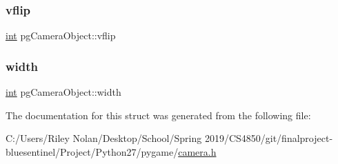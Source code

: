 \mbox{\label{structpg_camera_object_ae1a6d26813772f7fe9e13416ca05f1b8}} 
\subsubsection{\texorpdfstring{vflip}{vflip}}
{\footnotesize\ttfamily \mbox{\hyperlink{warnings_8h_a74f207b5aa4ba51c3a2ad59b219a423b}{int}} pg\+Camera\+Object\+::vflip}

\mbox{\label{structpg_camera_object_ad791238437a5d71c140bd39d6af87271}} 
\subsubsection{\texorpdfstring{width}{width}}
{\footnotesize\ttfamily \mbox{\hyperlink{warnings_8h_a74f207b5aa4ba51c3a2ad59b219a423b}{int}} pg\+Camera\+Object\+::width}



The documentation for this struct was generated from the following file\+:\begin{DoxyCompactItemize}
\item 
C\+:/\+Users/\+Riley Nolan/\+Desktop/\+School/\+Spring 2019/\+C\+S4850/git/finalproject-\/bluesentinel/\+Project/\+Python27/pygame/\mbox{\hyperlink{camera_8h}{camera.\+h}}\end{DoxyCompactItemize}

